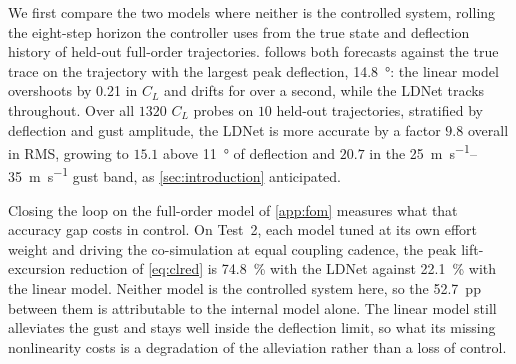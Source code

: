 We first compare the two models where neither is the controlled system, rolling the
eight-step horizon the controller uses from the true state and deflection history of held-out
full-order trajectories.  follows both forecasts against the true
trace on the trajectory with the largest peak deflection, \SI{14.8}{\degree}: the linear
model overshoots by \num{0.21} in $C_L$ and drifts for over a second, while
the LDNet tracks throughout. Over all $1320$ $C_L$ probes on $10$ held-out trajectories, stratified
by deflection and gust amplitude, the LDNet is more accurate by a factor $9.8$ overall in RMS, growing to $15.1$ above \SI{11}{\degree} of
deflection and $20.7$ in the \SIrange{25}{35}{\meter\per\second} gust band, as
\cref{sec:introduction} anticipated.

Closing the loop on the full-order model of \cref{app:fom} measures what that accuracy gap
costs in control. On Test~2, each model tuned at its own effort weight and driving the
co-simulation at equal coupling cadence, the peak lift-excursion reduction of
\cref{eq:clred} is \SI{74.8}{\percent} with the LDNet against \SI{22.1}{\percent} with the
linear model. Neither model is the controlled system here, so the \SI{52.7}{pp} between them
is attributable to the internal model alone. The linear model still alleviates the gust and
stays well inside the deflection limit, so what its missing nonlinearity costs is a
degradation of the alleviation rather than a loss of control.

